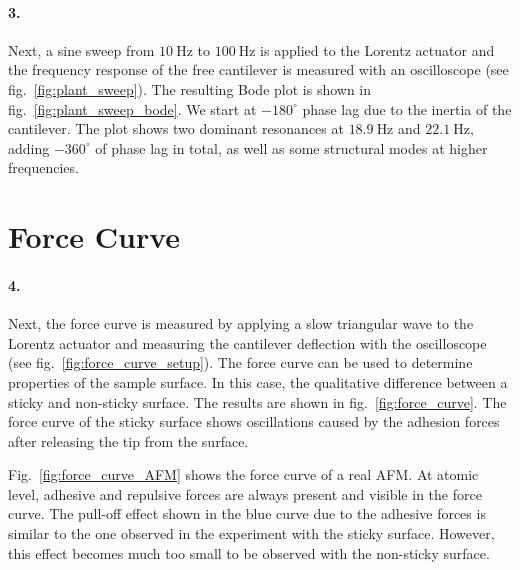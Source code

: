 \documentclass[a4paper,twoside,11pt,DIV=13,BCOR=5mm,numbers=noenddot]{scrbook}
\begin{document}

\paragraph*{3.}


Next, a sine sweep from $\qty{10}{\Hz}$ to $\qty{100}{\Hz}$ is applied to the Lorentz actuator and the frequency response of the free cantilever is measured with an oscilloscope (see fig.~\ref{fig:plant_sweep}).
The resulting Bode plot is shown in fig.~\ref{fig:plant_sweep_bode}.
We start at $-180^{\circ}$ phase lag due to the inertia of the cantilever. The plot shows two dominant resonances at $\qty{18.9}{\Hz}$ and $\qty{22.1}{\Hz}$, adding $-360^{\circ}$ of phase lag in total, as well as some structural modes at higher frequencies.



\FloatBarrier
\section{Force Curve}

\paragraph*{4.}


Next, the force curve is measured by applying a slow triangular wave to the Lorentz actuator and measuring the cantilever deflection with the oscilloscope (see fig.~\ref{fig:force_curve_setup}).
The force curve can be used to determine properties of the sample surface. In this case, the qualitative difference between a sticky and non-sticky surface.
The results are shown in fig.~\ref{fig:force_curve}. The force curve of the sticky surface shows oscillations caused by the adhesion forces after releasing the tip from the surface.

Fig.~\ref{fig:force_curve_AFM} shows the force curve of a real AFM. At atomic level, adhesive and repulsive forces are always present and visible in the force curve.
The pull-off effect shown in the blue curve due to the adhesive forces is similar to the one observed in the experiment with the sticky surface.
However, this effect becomes much too small to be observed with the non-sticky surface.
\end{document}
